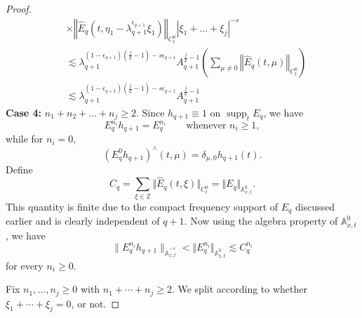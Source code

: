 \documentclass[10pt,a4paper]{amsart}
\newcommand{\A}{\mathbb A}
\newcommand{\Z}{\mathbb Z}
\begin{document}
\begin{proof}
\begin{equation}
\begin{split}
           &\times \left\Vert \hat{E}_q(t,\eta_1 - \lambda_{q+1}^{\epsilon_{q+1}} \xi_1) \right\Vert_{C_t^0} |\xi_1 + \ldots + \xi_j|^{-s}\\
           &\lesssim \lambda_{q+1}^{(1-\epsilon_{q+1})\left(\frac{j}{k}-1\right) - s\epsilon_{q+1}} A_{q+1}^{\frac{j}{k}-1} \left(\sum_{\mu \not=0} \left\Vert \hat{E}_q(t,\mu) \right\Vert_{C_t^0}\right)\\
           &\lesssim \lambda_{q+1}^{(1-\epsilon_{q+1})\left(\frac{j}{k}-1\right) - s\epsilon_{q+1}} A_{q+1}^{\frac{j}{k}-1}
        \end{split}
    \end{equation}
    \textbf{Case 4:} $n_1 + n_2 + \ldots + n_j \geq 2$.
    Since $h_{q+1}\equiv 1$ on $\operatorname{supp}_t E_q$, we have
\[
    E_q^{n_i}h_{q+1}=E_q^{n_i}
    \qquad \text{whenever } n_i\geq 1,
\]
while for $n_i=0$,
\[
    \left(E_q^0h_{q+1}\right)^\wedge(t,\mu)
    =
    \delta_{\mu,0}h_{q+1}(t).
\]
Define
$$
C_q = \sum_{\xi \in \Z} \Vert \hat{E}_q(t,\xi) \Vert_{C_t^0} = \Vert E_q \Vert_{\A^0_{x,t}}.
$$
This quantity is finite due to the compact frequency support of $E_q$ discussed earlier and is clearly independent of $q+1$. Now using the algebra property of $\A^{0}_{x,t}$, we have
\[
    \|E_q^{n_i}h_{q+1}\|_{\dot{\mathbb{A}}_{x,t}^{-s}} < \Vert E_q^{n_i} \Vert_{\A^0_{x,t}}
    \lesssim C_q^{n_i}
\]
for every $n_i\geq0$.

Fix $n_1,\ldots,n_j\geq0$ with $n_1+\cdots+n_j\geq2$. We split according to whether $\xi_1+\cdots+\xi_j=0$, or not.


\end{proof}
\end{document}
